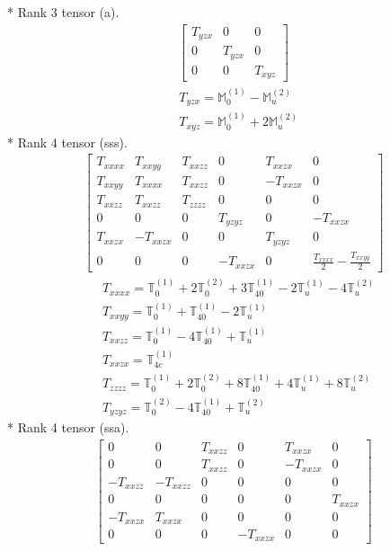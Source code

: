 \documentclass[fleqn,8pt,landscape]{jsarticle}
\begin{document}
* Rank 3 tensor (a).
\begin{align*}
\begin{bmatrix} T_{yzx} & 0 & 0 \\ 0 & T_{yzx} & 0 \\ 0 & 0 & T_{xyz} \end{bmatrix}
\end{align*}
\begin{align*}
& T_{yzx} = \mathbb{M}_{0}^{(1)} - \mathbb{M}_{u}^{(2)} \\
& T_{xyz} = \mathbb{M}_{0}^{(1)} + 2 \mathbb{M}_{u}^{(2)}
\end{align*}
* Rank 4 tensor (sss).
\begin{align*}
\begin{bmatrix} T_{xxxx} & T_{xxyy} & T_{xxzz} & 0 & T_{xxzx} & 0 \\ T_{xxyy} & T_{xxxx} & T_{xxzz} & 0 & - T_{xxzx} & 0 \\ T_{xxzz} & T_{xxzz} & T_{zzzz} & 0 & 0 & 0 \\ 0 & 0 & 0 & T_{yzyz} & 0 & - T_{xxzx} \\ T_{xxzx} & - T_{xxzx} & 0 & 0 & T_{yzyz} & 0 \\ 0 & 0 & 0 & - T_{xxzx} & 0 & \frac{T_{xxxx}}{2} - \frac{T_{xxyy}}{2} \end{bmatrix}
\end{align*}
\begin{align*}
& T_{xxxx} = \mathbb{T}_{0}^{(1)} + 2 \mathbb{T}_{0}^{(2)} + 3 \mathbb{T}_{40}^{(1)} - 2 \mathbb{T}_{u}^{(1)} - 4 \mathbb{T}_{u}^{(2)} \\
& T_{xxyy} = \mathbb{T}_{0}^{(1)} + \mathbb{T}_{40}^{(1)} - 2 \mathbb{T}_{u}^{(1)} \\
& T_{xxzz} = \mathbb{T}_{0}^{(1)} - 4 \mathbb{T}_{40}^{(1)} + \mathbb{T}_{u}^{(1)} \\
& T_{xxzx} = \mathbb{T}_{4c}^{(1)} \\
& T_{zzzz} = \mathbb{T}_{0}^{(1)} + 2 \mathbb{T}_{0}^{(2)} + 8 \mathbb{T}_{40}^{(1)} + 4 \mathbb{T}_{u}^{(1)} + 8 \mathbb{T}_{u}^{(2)} \\
& T_{yzyz} = \mathbb{T}_{0}^{(2)} - 4 \mathbb{T}_{40}^{(1)} + \mathbb{T}_{u}^{(2)}
\end{align*}
* Rank 4 tensor (ssa).
\begin{align*}
\begin{bmatrix} 0 & 0 & T_{xxzz} & 0 & T_{xxzx} & 0 \\ 0 & 0 & T_{xxzz} & 0 & - T_{xxzx} & 0 \\ - T_{xxzz} & - T_{xxzz} & 0 & 0 & 0 & 0 \\ 0 & 0 & 0 & 0 & 0 & T_{xxzx} \\ - T_{xxzx} & T_{xxzx} & 0 & 0 & 0 & 0 \\ 0 & 0 & 0 & - T_{xxzx} & 0 & 0 \end{bmatrix}
\end{align*}
\end{document}
